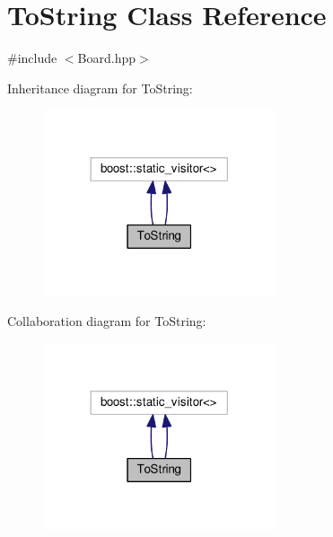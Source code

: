 \hypertarget{class_to_string}{}\section{To\+String Class Reference}
\label{class_to_string}


{\ttfamily \#include $<$Board.\+hpp$>$}



Inheritance diagram for To\+String\+:\nopagebreak
\begin{figure}[H]
\begin{center}
\leavevmode
\includegraphics[width=194pt]{class_to_string__inherit__graph}
\end{center}
\end{figure}


Collaboration diagram for To\+String\+:\nopagebreak
\begin{figure}[H]
\begin{center}
\leavevmode
\includegraphics[width=194pt]{class_to_string__coll__graph}
\end{center}
\end{figure}
